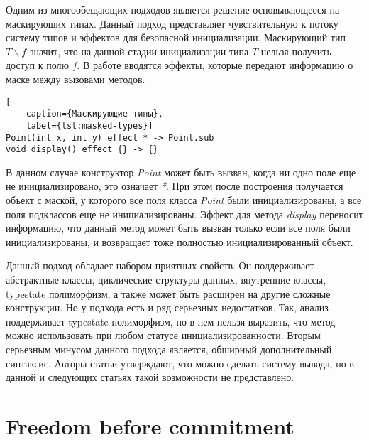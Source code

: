 Одним из многообещающих подходов является решение основывающееся на маскирующих типах\cite{masked-types}.
Данный подход представляет чувствительную к потоку систему типов и эффектов для безопасной инициализации.
Маскирующий тип $T \backslash f$ значит, что на данной стадии инициализации типа $T$ нельзя получить доступ к полю $f$.
В работе вводятся эффекты, которые передают информацию о маске между вызовами методов.
\begin{lstlisting}[
    caption={Маскирующие типы},
    label={lst:masked-types}]
Point(int x, int y) effect * -> Point.sub
void display() effect {} -> {}
\end{lstlisting}
В данном случае конструктор \emph{Point} может быть вызван, когда ни одно поле еще не инициализировано, это означает \emph{*}.
При этом после построения получается объект с маской, у которого все поля класса \emph{Point} были инициализированы,
а все поля подклассов еще не инициализированы.
Эффект для метода \emph{display} переносит информацию, что данный метод может быть вызван только если все поля были инициализированы,
и возвращает тоже полностью инициализированный объект.

Данный подход обладает набором приятных свойств.
Он поддерживает абстрактные классы, циклические структуры данных, внутренние классы, typestate полиморфизм,
а также может быть расширен на другие сложные конструкции.
Но у подхода есть и ряд серьезных недостатков.
Так, анализ поддерживает typestate полиморфизм, но в нем нельзя выразить,
что метод можно использовать при любом статусе инициализированности.
Вторым серьезным минусом данного подхода является, обширный дополнительный синтаксис.
Авторы статьи утверждают, что можно сделать систему вывода, но в данной и следующих статьях такой возможности не представлено.


\section{Freedom before commitment}\label{sec:the-freedom-model}

